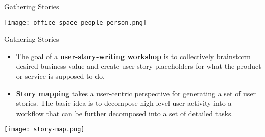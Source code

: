 \documentclass{beamer}
\begin{document}





\begin{frame}[fragile]{Gathering Stories}


\begin{center}
\texttt{[image: office-space-people-person.png]}
\end{center}


\end{frame}

\begin{frame}[fragile]{Gathering Stories}

\vspace{-.1in}
\begin{itemize}
\item The goal of a {\bf user-story-writing workshop} is to collectively brainstorm desired business value and create user story placeholders for what the product or service is supposed to do.
\item {\bf Story mapping} takes a user-centric perspective for generating a set of user stories. The basic idea is to decompose high-level user activity into a workflow that can be further decomposed into a set of detailed tasks.
\end{itemize}
\begin{center}
\texttt{[image: story-map.png]}
\end{center}


\end{frame}
\end{document}
